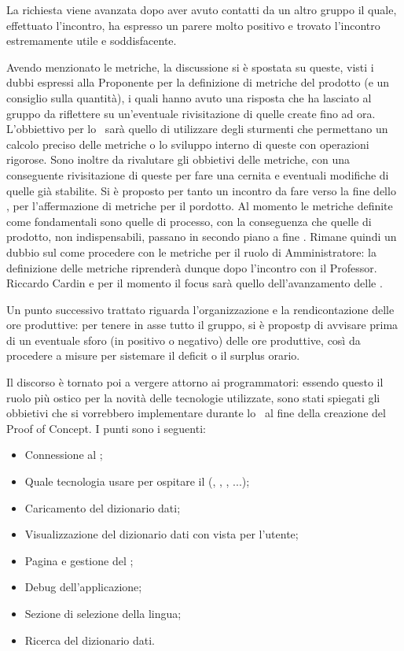 La richiesta viene avanzata dopo aver avuto contatti da un altro gruppo il quale, effettuato l'incontro, ha espresso un parere molto positivo e trovato l'incontro estremamente utile e soddisfacente.
\par Avendo menzionato le metriche, la discussione si è spostata su queste, visti i dubbi espressi alla Proponente per la definizione di metriche del prodotto (e un consiglio sulla quantità), i quali hanno avuto una risposta che ha lasciato al gruppo da riflettere su un'eventuale rivisitazione di quelle create fino ad ora. 
L'obbiettivo per lo \ sarà quello di utilizzare degli sturmenti che permettano un calcolo preciso delle metriche o lo sviluppo interno di queste con operazioni rigorose. 
Sono inoltre da rivalutare gli obbietivi delle metriche, con una conseguente rivisitazione di queste per fare una cernita e eventuali modifiche di quelle già stabilite.
Si è proposto per tanto un incontro da fare verso la fine dello , per l'affermazione di metriche per il pordotto.
Al momento le metriche definite come fondamentali sono quelle di processo, con la conseguenza che quelle di prodotto, non indispensabili, passano in secondo piano a fine .
Rimane quindi un dubbio sul come procedere con le metriche per il ruolo di Amministratore: la definizione delle metriche riprenderà dunque dopo l'incontro con il Professor. Riccardo Cardin e per il momento il focus sarà quello dell'avanzamento delle \NdP.
\par Un punto successivo trattato riguarda l'organizzazione e la rendicontazione delle ore produttive: per tenere in asse tutto il gruppo, si è propostp di avvisare prima di un eventuale sforo (in positivo o negativo) delle ore produttive, così da procedere a misure per sistemare il deficit o il surplus orario.
\par Il discorso è tornato poi a vergere attorno ai programmatori: essendo questo il ruolo più ostico per la novità delle tecnologie utilizzate, sono stati spiegati gli obbietivi che si vorrebbero implementare durante lo \ al fine della creazione del Proof of Concept. I punti sono i seguenti:
\begin{itemize}
	\item Connessione al ;
	\item Quale tecnologia usare per ospitare il  (, , , ...);
	\item Caricamento del dizionario dati;
	\item Visualizzazione del dizionario dati con vista per l'utente;
	\item Pagina e gestione del ; 
	\item Debug dell'applicazione;
	\item Sezione di selezione della lingua;
	\item Ricerca del dizionario dati.
\end{itemize}
